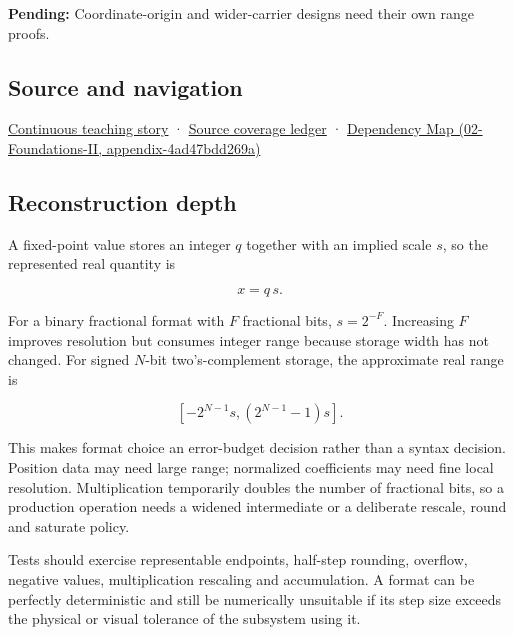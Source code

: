 \textbf{Pending:} Coordinate-origin and wider-carrier designs need their own range proofs.

\subsection{Source and navigation}\label{appendix-ceb4c4a9b5a1-source-and-navigation}

\hyperref[01-foundations-i-ch001-choosing-what-information-to-keep]{Continuous teaching story} · \hyperref[appendix-fd090d982a15]{Source coverage ledger} · \href{../02-Foundations-II/main.pdf\#nameddest=appendix-4ad47bdd269a}{Dependency Map (02-Foundations-II, appendix-4ad47bdd269a)}

\subsection{Reconstruction depth}\label{appendix-ceb4c4a9b5a1-reconstruction-depth}

A fixed-point value stores an integer \(q\) together with an implied scale \(s\), so the represented real quantity is

\[
x=q\,s.
\]

For a binary fractional format with \(F\) fractional bits, \(s=2^{-F}\). Increasing \(F\) improves resolution but consumes integer range because storage width has not changed. For signed \(N\)-bit two's-complement storage, the approximate real range is

\[
[-2^{N-1}s,(2^{N-1}-1)s].
\]

This makes format choice an error-budget decision rather than a syntax decision. Position data may need large range; normalized coefficients may need fine local resolution. Multiplication temporarily doubles the number of fractional bits, so a production operation needs a widened intermediate or a deliberate rescale, round and saturate policy.

Tests should exercise representable endpoints, half-step rounding, overflow, negative values, multiplication rescaling and accumulation. A format can be perfectly deterministic and still be numerically unsuitable if its step size exceeds the physical or visual tolerance of the subsystem using it.
